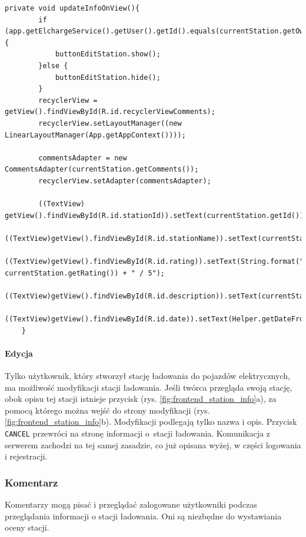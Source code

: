 \begin{lstlisting}[label=list:updateInfoOnView,caption=Odnowienie informacji o stacji na ekranie,basicstyle=\tiny\ttfamily]
    private void updateInfoOnView(){
        if (app.getElchargeService().getUser().getId().equals(currentStation.getOwnerID())){
            buttonEditStation.show();
        }else {
            buttonEditStation.hide();
        }
        recyclerView = getView().findViewById(R.id.recyclerViewComments);
        recyclerView.setLayoutManager((new LinearLayoutManager(App.getAppContext())));

        commentsAdapter = new CommentsAdapter(currentStation.getComments());
        recyclerView.setAdapter(commentsAdapter);

        ((TextView) getView().findViewById(R.id.stationId)).setText(currentStation.getId());
        ((TextView)getView().findViewById(R.id.stationName)).setText(currentStation.getStationName());
        ((TextView)getView().findViewById(R.id.rating)).setText(String.format("%.2f", currentStation.getRating()) + " / 5");
        ((TextView)getView().findViewById(R.id.description)).setText(currentStation.getDescription());
        ((TextView)getView().findViewById(R.id.date)).setText(Helper.getDateFromISO8601(currentStation.getUpdateAt()));
    }
\end{lstlisting}

\paragraph{Edycja\newline}
Tylko użytkownik, który stworzył stację ładowania do pojazdów elektrycznych, ma możliwość modyfikacji stacji ładowania. Jeśli twórca przegląda swoją stację, obok opisu tej stacji istnieje przycisk (rys. \ref{fig:frontend_station_info}a), za pomocą którego można wejść do strony modyfikacji (rys. \ref{fig:frontend_station_info}b).
Modyfikacji podlegają tylko nazwa i opis. Przycisk \texttt{CANCEL} przewróci na stronę informacji o~stacji ładowania. Komunikacja z serwerem zachodzi na tej samej zasadzie, co już opisana wyżej, w części logowania i rejestracji.

\subsubsection{Komentarz}
Komentarzy mogą pisać i przeglądać zalogowane użytkowniki podczas przeglądania informacji o stacji ładowania. Oni są niezbędne do wystawiania oceny stacji.
